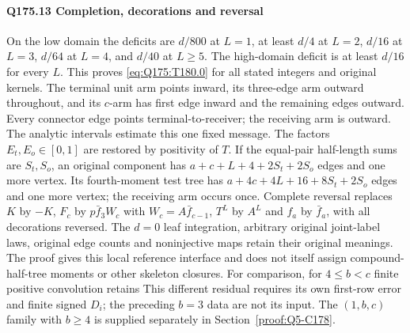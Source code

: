 \paragraph{Q175.13 Completion, decorations and reversal}\label{part:Q175.13}
On the low domain the deficits are $d/800$ at $L=\allowbreak 1$, at least $d/4$
at $L=\allowbreak 2$, $d/16$ at $L=\allowbreak 3$, $d/64$ at $L=\allowbreak 4$, and $d/40$ at $L\ge\allowbreak 5$.
The high-domain deficit is at least $d/16$ for every $L$.
This proves \eqref{eq:Q175:T180.0} for all stated integers and original kernels.
The terminal unit arm points inward, its three-edge arm outward throughout,
and its $c$-arm has first edge inward and the remaining edges outward.
Every connector edge points terminal-to-receiver; the receiving arm is
outward. The analytic intervals estimate this one fixed message.
The factors $E_t,\allowbreak E_o\in[0,\allowbreak 1]$ are restored by positivity of $T$.
If the equal-pair half-length sums are $S_t,\allowbreak S_o$, an original component
has $a+c+L+4+2S_t+2S_o$ edges and one more vertex.
Its fourth-moment test tree has $a+4c+4L+16+8S_t+2S_o$ edges and one
more vertex; the receiving arm occurs once.
Complete reversal replaces $K$ by $-K$, $F_c$ by
$p\bar f_3W_c$ with $W_c=\allowbreak A\bar f_{c-1}$, $T^L$ by $A^L$ and
$f_a$ by $\bar f_a$, with all decorations reversed.
The $d=\allowbreak 0$ leaf integration, arbitrary original joint-label laws,
original edge counts and noninjective maps retain their original meanings.
The proof gives this local reference interface and does not itself assign
compound-half-tree moments or other skeleton closures.
For comparison, for $4\le\allowbreak  b<\allowbreak c$ finite positive convolution retains
This different residual requires its own first-row error and finite signed
$D_i$; the preceding $b=\allowbreak 3$ data are not its input.
The $(1,\allowbreak b,\allowbreak c)$ family with $b\ge\allowbreak 4$ is supplied separately in
Section~\ref{proof:Q5-C178}.
